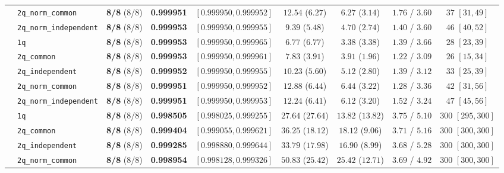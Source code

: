 \documentclass[10pt,a4paper]{article}
\begin{document}
\begin{table}[h!]
{\begin{tabular}{llccccccc}
  & \texttt{2q\_norm\_common} & \textbf{8/8} (8/8) & \textbf{0.999951} & $[0.999950, 0.999952]$ & $12.54$ ($6.27$) & $6.27$ ($3.14$) & $1.76$ / $3.60$ & $37$ $[31, 49]$ \\
  & \texttt{2q\_norm\_independent} & \textbf{8/8} (8/8) & \textbf{0.999953} & $[0.999950, 0.999955]$ & $9.39$ ($5.48$) & $4.70$ ($2.74$) & $1.40$ / $3.60$ & $46$ $[40, 52]$ \\
\midrule
  & \texttt{1q} & \textbf{8/8} (8/8) & \textbf{0.999953} & $[0.999950, 0.999965]$ & $6.77$ ($6.77$) & $3.38$ ($3.38$) & $1.39$ / $3.66$ & $28$ $[23, 39]$ \\
  & \texttt{2q\_common} & \textbf{8/8} (8/8) & \textbf{0.999953} & $[0.999950, 0.999961]$ & $7.83$ ($3.91$) & $3.91$ ($1.96$) & $1.22$ / $3.09$ & $26$ $[15, 34]$ \\
  & \texttt{2q\_independent} & \textbf{8/8} (8/8) & \textbf{0.999952} & $[0.999950, 0.999955]$ & $10.23$ ($5.60$) & $5.12$ ($2.80$) & $1.39$ / $3.12$ & $33$ $[25, 39]$ \\
  & \texttt{2q\_norm\_common} & \textbf{8/8} (8/8) & \textbf{0.999951} & $[0.999950, 0.999952]$ & $12.88$ ($6.44$) & $6.44$ ($3.22$) & $1.28$ / $3.36$ & $42$ $[31, 56]$ \\
  & \texttt{2q\_norm\_independent} & \textbf{8/8} (8/8) & \textbf{0.999951} & $[0.999950, 0.999953]$ & $12.24$ ($6.41$) & $6.12$ ($3.20$) & $1.52$ / $3.24$ & $47$ $[45, 56]$ \\
\midrule
  & \texttt{1q} & \textbf{8/8} (8/8) & \textbf{0.998505} & $[0.998025, 0.999255]$ & $27.64$ ($27.64$) & $13.82$ ($13.82$) & $3.75$ / $5.10$ & $300$ $[295, 300]$ \\
  & \texttt{2q\_common} & \textbf{8/8} (8/8) & \textbf{0.999404} & $[0.999055, 0.999621]$ & $36.25$ ($18.12$) & $18.12$ ($9.06$) & $3.71$ / $5.16$ & $300$ $[300, 300]$ \\
  & \texttt{2q\_independent} & \textbf{8/8} (8/8) & \textbf{0.999285} & $[0.998880, 0.999644]$ & $33.79$ ($17.98$) & $16.90$ ($8.99$) & $3.68$ / $5.28$ & $300$ $[300, 300]$ \\
  & \texttt{2q\_norm\_common} & \textbf{8/8} (8/8) & \textbf{0.998954} & $[0.998128, 0.999326]$ & $50.83$ ($25.42$) & $25.42$ ($12.71$) & $3.69$ / $4.92$ & $300$ $[300, 300]$ \\

\end{tabular}}
\end{table}
\end{document}
